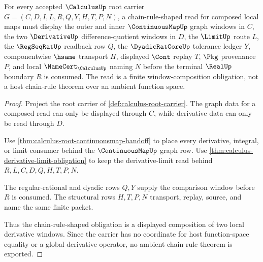 \begin{theorem}
\label{thm:calculus-root-chain-rule-window-obligation}
For every accepted $\CalculusUp$ root carrier $G=(C,D,I,L,R,Q,Y,H,T,P,N)$, a chain-rule-shaped read for composed local maps must display the outer and inner $\ContinuousMapUp$ graph windows in $C$, the two $\DerivativeUp$ difference-quotient windows in $D$, the $\LimitUp$ route $L$, the $\RegSeqRatUp$ readback row $Q$, the $\DyadicRatCoreUp$ tolerance ledger $Y$, componentwise $\hsame$ transport $H$, displayed $\Cont$ replay $T$, $\Pkg$ provenance $P$, and local $\NameCert_{\CalculusUp}$ naming $N$ before the terminal $\RealUp$ boundary $R$ is consumed. The read is a finite window-composition obligation, not a host chain-rule theorem over an ambient function space.
\end{theorem}
\begin{proof}
Project the root carrier of \autoref{def:calculus-root-carrier}. The graph data for a composed read can only be displayed through $C$, while derivative data can only be read through $D$.

Use \autoref{thm:calculus-root-continuousmap-handoff} to place every derivative, integral, or limit consumer behind the $\ContinuousMapUp$ graph row. Use \autoref{thm:calculus-derivative-limit-obligation} to keep the derivative-limit read behind $R,L,C,D,Q,H,T,P,N$.

The regular-rational and dyadic rows $Q,Y$ supply the comparison window before $R$ is consumed. The structural rows $H,T,P,N$ transport, replay, source, and name the same finite packet.

Thus the chain-rule-shaped obligation is a displayed composition of two local derivative windows. Since the carrier has no coordinate for host function-space equality or a global derivative operator, no ambient chain-rule theorem is exported.
\end{proof}

